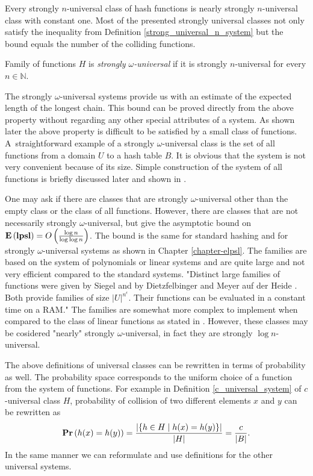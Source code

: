 Every strongly $n$-universal class of hash functions is nearly strongly $n$-universal class with constant one. Most of the presented strongly universal classes not only satisfy the inequality from Definition \ref{strong_universal_n_system} but the bound equals the number of the colliding functions.

\begin{definition}
\label{strong_universal_omega_system}
Family of functions $H$ is \emph{strongly $\omega$-universal} if it is strongly $n$-universal for every $n \in \mathbb{N}$.
\end{definition}

The strongly $\omega$-universal systems provide us with an estimate of the expected length of the longest chain. This bound can be proved directly from the above property without regarding any other special attributes of a system. As shown later the above property is difficult to be satisfied by a small class of functions. A~straightforward example of a strongly $\omega$-universal class is the set of all functions from a domain $U$ to a hash table $B$. It is obvious that the system is not very convenient because of its size. Simple construction of the system of all functions is briefly discussed later and shown in \cite{1382617}.

One may ask if there are classes that are strongly $\omega$-universal other than the empty class or the class of all functions. However, there are classes that are not necessarily strongly $\omega$-universal, but give the asymptotic bound on $\mathbf{E}\left(\mathbf{lpsl}\right) = O\left(\frac{\log n}{\log \log n}\right)$. The bound is the same for standard hashing and for strongly $\omega$-universal systems as shown in Chapter \ref{chapter-elpsl}. The families are based on the system of polynomials or linear systems and are quite large and not very efficient compared to the standard systems. "Distinct large families of functions were given by Siegel \cite{90406} and by Dietzfelbinger and Meyer auf der Heide \cite{1398663}. Both provide families of size $|U|^{n^\epsilon}$. Their functions can be evaluated in a constant time on a RAM." The families are somewhat more complex to implement when compared to the class of linear functions as stated in \cite{1382617}. However, these classes may be cosidered "nearly" strongly $\omega$-universal, in fact they are strongly $\log n$-universal.

The above definitions of universal classes can be rewritten in terms of probability as well. The probability space corresponds to the uniform choice of a function from the system of functions. For example in Definition \ref{c_universal_system} of $c$-universal class $H$, probability of collision of two different elements $x$ and $y$ can be rewritten as
\[
	\mathbf{Pr}\left(h(x) = h(y)\right) = \frac{|\{h \in H \mid h(x) = h(y)\}|}{|H|} = \frac{c}{|B|} \text{.}
\]
In the same manner we can reformulate and use definitions for the other universal systems.

